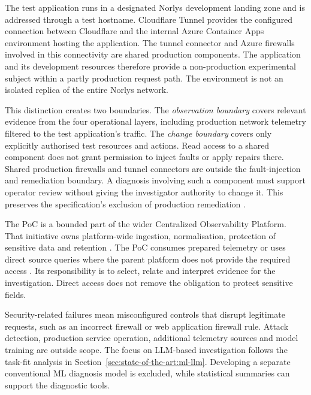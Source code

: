 The test application runs in a designated Norlys development landing zone
and is addressed through a test hostname. Cloudflare Tunnel provides the configured
connection between Cloudflare and the internal Azure Container Apps
environment hosting the application. The tunnel connector and Azure
firewalls involved in this connectivity are shared production components.
The application and its development resources therefore provide a
non-production experimental subject within a partly production request
path. The environment is not an isolated replica of the entire Norlys
network.

This distinction creates two boundaries. The \emph{observation boundary}
covers relevant evidence from the four operational layers, including
production network telemetry filtered to the test application's traffic.
The \emph{change boundary} covers only explicitly authorised test resources
and actions. Read access to a shared component does not grant permission
to inject faults or apply repairs there. Shared production firewalls and
tunnel connectors are outside the fault-injection and remediation boundary.
A diagnosis involving such a component must support operator review without
giving the investigator authority to change it. This preserves the
specification's exclusion of production remediation
\parencite[Scope, AC-1, AC-5]{norlys_operations_agents}.

The PoC is a bounded part of the wider Centralized Observability Platform.
That initiative owns platform-wide ingestion, normalisation, protection of
sensitive data and retention \parencite{norlys_observability_spec}. The PoC
consumes prepared telemetry or uses direct source queries where the parent
platform does not provide the required access
\parencite[Relationship to the Parent Story]{norlys_operations_agents}.
Its responsibility is to select, relate and interpret evidence for the
investigation. Direct access does not remove the obligation to protect
sensitive fields.

Security-related failures mean misconfigured controls that disrupt
legitimate requests, such as an incorrect firewall or web application
firewall rule. Attack detection, production service operation, additional
telemetry sources and model training are outside scope. The focus on
LLM-based investigation follows the task-fit analysis in
Section~\ref{sec:state-of-the-art:ml-llm}. Developing a separate conventional
ML diagnosis model is excluded, while statistical summaries can support
the diagnostic tools.

